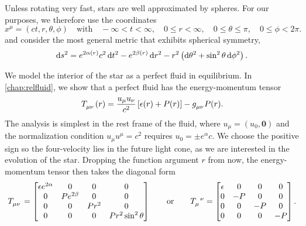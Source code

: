 Unless rotating very fast, stars are well approximated by spheres.
For our purposes, we therefore use the coordinates
\begin{equation}
	x^\mu = (c t, r, \theta, \phi)
	\quad \text{with} \quad
	-\infty < t < \infty, \quad
	0 \leq r < \infty, \quad
	0 \leq \theta \leq \pi, \quad
	0 \leq \phi < 2 \pi .
\end{equation}
and consider the most general metric that exhibits spherical symmetry, \cite[equation 5.11]{ref:carroll}
\begin{equation}
	\mathop{}\!\mathrm{d} s^2 = e^{2 \alpha(r)} c^2 \mathop{}\!\mathrm{d} t^2 - e^{2 \beta(r)} \mathop{}\!\mathrm{d} r^2 - r^2 \left( \mathop{}\!\mathrm{d} \theta^2 + \sin^2 \theta \mathop{}\!\mathrm{d} \phi^2 \right) .
\label{eq:tov:metric}
\end{equation}

We model the interior of the star as a perfect fluid in equilibrium.
In \cref{chap:relfluid}, we show that a perfect fluid has the energy-momentum tensor
\begin{equation}
	T\indices{_\mu_\nu}(r) = \frac{u_\mu u_\nu}{c^2} \left[ \epsilon(r)+P(r) \right]  - g\indices{_\mu_\nu} P(r) .
	\label{eq:tov:energy_momentum_perfect_fluid}
\end{equation}
The analysis is simplest in the rest frame of the fluid, where $u_\mu = (u_0, \textbf{0})$ and the normalization condition $u_\mu u^\mu = c^2$ requires $u_0 = \pm e^\alpha c$.
We choose the positive sign so the four-velocity lies in the future light cone, as we are interested in the evolution of the star.
Dropping the function argument $r$ from now, the energy-momentum tensor then takes the diagonal form
\begin{equation}
T\indices{_\mu_\nu} =
\begin{bmatrix}
	\epsilon e^{2\alpha} & 0            & 0     & 0                   \\
	0                    & P e^{2\beta} & 0     & 0                   \\
	0                    & 0            & P r^2 & 0                   \\
	0                    & 0            & 0     & P r^2 \sin^2 \theta \\
\end{bmatrix}
\qquad \text{or} \qquad
T\indices{_\mu^\nu} =
\begin{bmatrix}
	\epsilon &  0 &  0 &  0 \\
	0        & -P &  0 &  0 \\
	0        &  0 & -P &  0 \\
	0        &  0 &  0 & -P \\
\end{bmatrix}
.
\label{eq:einstein_to_tov:T}
\end{equation}

